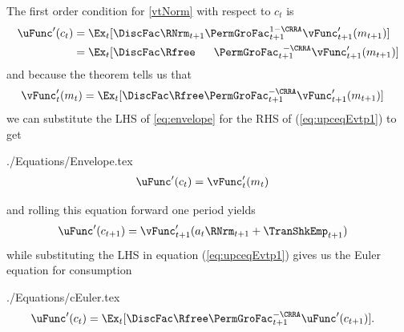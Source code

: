 \documentclass[titlepage, headings=optiontotocandhead]{\econtex}
\begin{document}
The first order condition for \eqref{vtNorm} with respect to ${c}_{t}$ is
\begin{equation}\begin{gathered}\begin{aligned}
      \uFunc^{\prime}({c}_{t})  & = \Ex_{t}[\DiscFac \RNrm_{t+1}\PermGroFac_{t+1}^{1-\CRRA}\null{\vFunc}^{\prime}_{t+1}({m}_{t+1})]  \nonumber 
      \\                        & =  \Ex_{t}[\DiscFac\Rfree\phantom{._{t+1}}\PermGroFac_{t+1}^{\phantom{1}-\CRRA}\null{\vFunc}^{\prime}_{t+1}({m}_{t+1})] \label{eq:upceqEvtp1}
    \end{aligned}\end{gathered}\end{equation}
and because the  theorem tells us that
\begin{equation}\begin{gathered}\begin{aligned}
      \null{\vFunc}^{\prime}_{t}({m}_{t})  & =  \Ex_{t} [\DiscFac\Rfree\PermGroFac_{t+1}^{-\CRRA}\null{\vFunc}^{\prime}_{t+1}({m}_{t+1})] \label{eq:envelope}
    \end{aligned}\end{gathered}\end{equation}
we can substitute the LHS of \eqref{eq:envelope} for the RHS of
(\ref{eq:upceqEvtp1}) to get
\begin{verbatimwrite}{./Equations/Envelope.tex}
  \begin{equation}\begin{gathered}\begin{aligned}
        \uFunc^{\prime}({c}_{t})  & = \null{\vFunc}^{\prime}_{t}({m}_{t})\label{eq:Envelope}
      \end{aligned}\end{gathered}\end{equation}
\end{verbatimwrite}
\unskip
and rolling this equation forward one period yields
\begin{equation}\begin{gathered}\begin{aligned}
      \uFunc^{\prime}({c}_{t+1})  & = \null{\vFunc}^{\prime}_{t+1}({a}_{t}\RNrm_{t+1}+\TranShkEmp_{t+1}) \label{eq:upctp1EqVpxtp1}
    \end{aligned}\end{gathered}\end{equation}
while substituting the LHS in equation (\ref{eq:upceqEvtp1})
gives us the Euler equation for consumption
\begin{verbatimwrite}{./Equations/cEuler.tex}
  \begin{equation}\begin{gathered}\begin{aligned}
        \uFunc^{\prime}({c}_{t})  & = \Ex_{t}[\DiscFac\Rfree \PermGroFac_{t+1}^{-\CRRA}\uFunc^{\prime}({c}_{t+1})]. \label{eq:cEuler}
      \end{aligned}\end{gathered}\end{equation}
\end{verbatimwrite}

\end{document}
